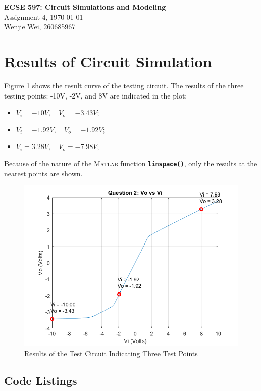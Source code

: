 \documentclass[a4paper,titlepage]{article}
\newcommand{\MATLAB}{\textsc{Matlab}\xspace}
\begin{document}
	\sloppy	
	
	\begin{center}
		{\LARGE \bf ECSE 597: Circuit Simulations and Modeling}\\
		{\large Assignment 4, \quad \today}\\
		{\large Wenjie Wei, 260685967}
	\end{center}

	\section{Results of Circuit Simulation}
		Figure \ref{res} shows the result curve of the testing circuit. The results of the three testing points: -10V, -2V, and 8V are indicated in the plot:
		\begin{itemize}
			\item $V_i = -10V, \quad V_o = -3.43V$;
			\item $V_i = -1.92V, \quad V_o = -1.92V$;
			\item $V_i = 3.28V, \quad V_o = -7.98V$;
		\end{itemize}
		
		Because of the nature of the \MATLAB function \texttt{\textbf{linspace()}}, only the results at the nearest points are shown. 
		\begin{figure}[H]
			\centering
			\includegraphics[width=0.7\linewidth]{graph}
			\caption{Results of the Test Circuit Indicating Three Test Points}
			\label{res}
		\end{figure}
	\newpage
	
	\begin{appendices}		
		\section{Code Listings} \label{appendix:code}
		
			
			\begin{center}
				\inputminted{matlab}{../../src/a4/dcsolvealpha.m}
				\label{dcsolve}
			\end{center}
			\begin{center}
				\inputminted{matlab}{../../src/a4/dcsolvecont.m}
				\label{dcsolvecont}
			\end{center}
	\end{appendices}
\end{document}
